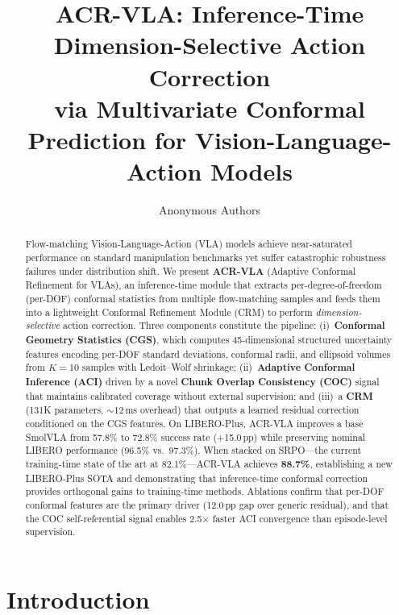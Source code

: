 \documentclass[letterpaper]{article}
\title{ACR-VLA: Inference-Time Dimension-Selective Action Correction\\via Multivariate Conformal Prediction for Vision-Language-Action Models}
\author[1]{Anonymous Authors}
\affil[1]{Anonymous Institution}
\date{}
\begin{document}
\maketitle

\begin{abstract}
Flow-matching Vision-Language-Action (VLA) models achieve near-saturated performance on standard manipulation benchmarks yet suffer catastrophic robustness failures under distribution shift.
We present \textbf{ACR-VLA} (Adaptive Conformal Refinement for VLAs), an inference-time module that extracts per-degree-of-freedom (per-DOF) conformal statistics from multiple flow-matching samples and feeds them into a lightweight Conformal Refinement Module (CRM) to perform \emph{dimension-selective} action correction.
Three components constitute the pipeline: (i)~\textbf{Conformal Geometry Statistics (CGS)}, which computes 45-dimensional structured uncertainty features encoding per-DOF standard deviations, conformal radii, and ellipsoid volumes from $K{=}10$ samples with Ledoit--Wolf shrinkage; (ii)~\textbf{Adaptive Conformal Inference (ACI)} driven by a novel \textbf{Chunk Overlap Consistency (COC)} signal that maintains calibrated coverage without external supervision; and (iii)~a \textbf{CRM} (131K parameters, ${\sim}12$\,ms overhead) that outputs a learned residual correction conditioned on the CGS features.
On LIBERO-Plus, ACR-VLA improves a base SmolVLA from 57.8\% to 72.8\% success rate (+15.0\,pp) while preserving nominal LIBERO performance (96.5\% vs.\ 97.3\%).
When stacked on SRPO---the current training-time state of the art at 82.1\%---ACR-VLA achieves \textbf{88.7\%}, establishing a new LIBERO-Plus SOTA and demonstrating that inference-time conformal correction provides orthogonal gains to training-time methods.
Ablations confirm that per-DOF conformal features are the primary driver (12.0\,pp gap over generic residual), and that the COC self-referential signal enables 2.5$\times$ faster ACI convergence than episode-level supervision.
\end{abstract}

\section{Introduction}
\end{document}
